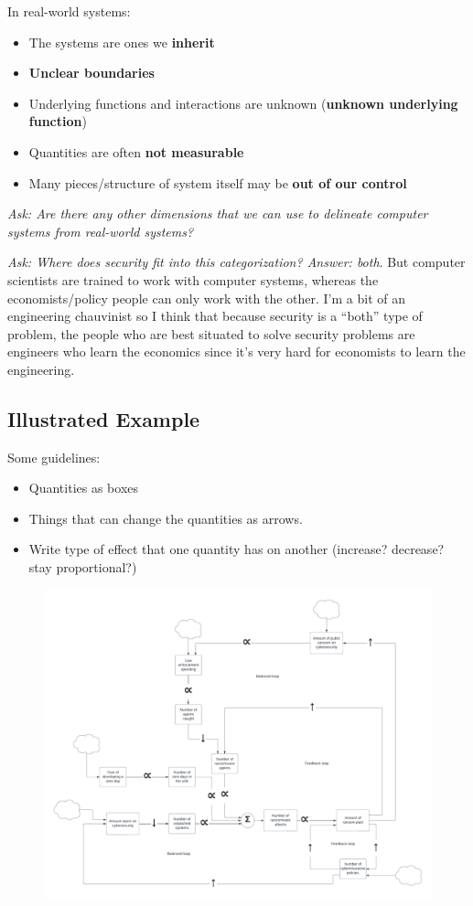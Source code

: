 \documentclass[11pt]{article}
\begin{document}
In real-world systems:
\begin{itemize}
    \item The systems are ones we {\bf inherit}
    \item {\bf Unclear boundaries}
    \item Underlying functions and interactions are unknown ({\bf unknown underlying function})
    \item Quantities are often {\bf not measurable}
    \item Many pieces/structure of system itself may be {\bf out of our control}
\end{itemize}

{\it Ask: Are there any other dimensions that we can use to delineate computer systems from real-world systems?}

{\it Ask: Where does security fit into this categorization? Answer: both}. But computer scientists are trained to work with computer systems, whereas the economists/policy people can only work with the other. I'm a bit of an engineering chauvinist so I think that because security is a ``both'' type of problem, the people who are best situated to solve security problems are engineers who learn the economics since it's very hard for economists to learn the engineering.

\subsection{Illustrated Example}
Some guidelines:
\begin{itemize}
    \item Quantities as boxes
    \item Things that can change the quantities as arrows.
    \item Write type of effect that one quantity has on another (increase? decrease? stay proportional?)
\end{itemize}

\begin{figure}[h]
    \includegraphics*[width=\textwidth]{ransomware-sys-diagram.pdf}
\end{figure}
\end{document}
